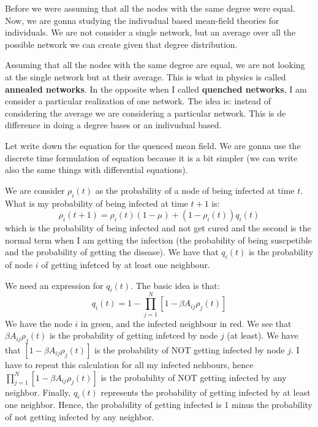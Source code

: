 \documentclass[../main/main.tex]{subfiles}
\begin{document}
Before we were assuming that all the nodes with the same degree were equal. Now, we are gonna studying the indivudual based mean-field theories for individuals.
We are not consider a single network, but an average over all the possible network we can create given that degree distribution.

Assuming that all the nodes with the same degree are equal, we are not looking at the single network but at their average. This is what in physics is called \textbf{annealed networks}.
In the opposite when I called \textbf{quenched networks}, I am consider a particular realization of one network. The idea is: instead of considering the average we are considering a particular network. This is de difference in doing a degree bases or an indivudual based.

Let write down the equation for the quenced mean field. We are gonna use the discrete time formulation of equation because it is a bit simpler (we can write also the same things with differential equations).

We are consider \( \rho _i (t) \) as the probability of a node of being infected at time \( t \). What is my probability of being infected at time \( t+1 \) is:
\begin{equation*}
  \rho _i (t+1) = \rho _i(t) (1- \mu ) + (1 - \rho _i(t))q_i(t)
\end{equation*}
which is the probability of being infected and not get cured and the second is the normal term when I am getting the infection (the probability of being suscpetible and the probability of getting the disease).
We have that \( q_i(t) \) is the probability of node \( i \) of getting infetced by at least one neighbour.

We need an expression for \( q_i(t) \). The basic idea is that:
\begin{equation*}
  q_i (t) = 1 - \prod_{j=1}^{N} [1- \beta A_{ij} \rho _j (t)]
\end{equation*}
We have the node \( i \) in green, and the infected neighbour in red. We see that \( \beta A_{ij} \rho _j (t) \) is the probability of getting infetced by node \( j \) (at least). We have that  \( [1- \beta A_{ij} \rho _j (t)] \) is the probability of NOT getting infected by node \( j \). I have to repeat this calculation for all my infected nehbours, hence \( \prod_{j=1}^{N} [1- \beta A_{ij} \rho _j (t)] \) is the probability of NOT getting infected by any neighbor.
Finally, \(   q_i (t) \) represents the probability of getting infected by at least one neighbor.
Hence, the probability of getting infected is 1 minus the probability of not getting infected by any neighbor.
\end{document}
